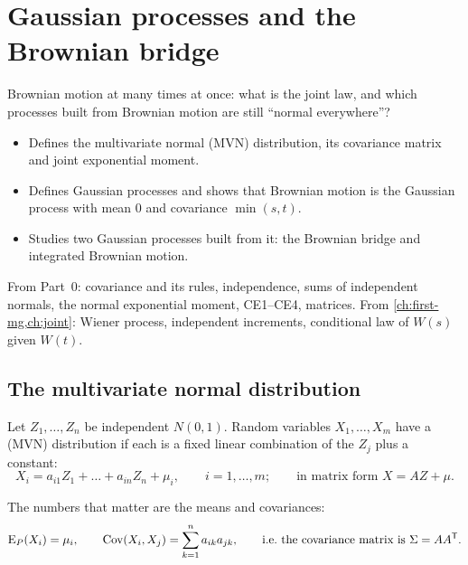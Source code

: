 \chapter{Gaussian processes and the Brownian bridge}
\label{ch:gaussian}

\begin{question}
Brownian motion at many times at once: what is the joint law, and which processes built from Brownian motion are still ``normal everywhere''?
\end{question}

\begin{whatfor}
\begin{itemize}
  \item Defines the multivariate normal (MVN) distribution, its covariance matrix and joint exponential moment.
  \item Defines Gaussian processes and shows that Brownian motion is the Gaussian process with mean $0$ and covariance $\min(s,t)$.
  \item Studies two Gaussian processes built from it: the Brownian bridge and integrated Brownian motion.
\end{itemize}
\end{whatfor}

\begin{prereq}
From Part~0: covariance and its rules, independence, sums of independent normals, the normal exponential moment, CE1--CE4, matrices. From \cref{ch:first-mg,ch:joint}: Wiener process, independent increments, conditional law of $W(s)$ given $W(t)$.
\end{prereq}

\section{The multivariate normal distribution}

\begin{definition}
\label{def:mvn}
Let $Z_1,\dots,Z_n$ be independent $N(0,1)$. Random variables $X_1,\dots,X_m$ have a  (MVN) distribution if each is a fixed linear combination of the $Z_j$ plus a constant:
\[
  X_i=a_{i1}Z_1+\dots+a_{in}Z_n+\mu_i,\qquad i=1,\dots,m;\qquad\text{in matrix form } X=AZ+\mu .
\]
\end{definition}

The numbers that matter are the means and covariances:
\[
  \operatorname{E}_P(X_i)=\mu_i,\qquad \operatorname{Cov}(X_i,X_j)=\sum_{k=1}^na_{ik}a_{jk},\qquad\text{i.e.\ the covariance matrix is }\Sigma=AA^{\mathsf T}.
\]

